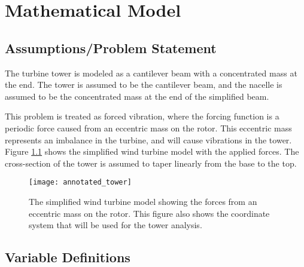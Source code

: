 \chapter{Mathematical Model} %

\label{ch_math_model}


\section{Assumptions/Problem Statement}

The turbine tower is modeled as a cantilever beam with a concentrated mass at the end.  The tower is assumed to be the cantilever beam, and the nacelle is assumed to be the concentrated mass at the end of the simplified beam.

This problem is treated as forced vibration, where the forcing function is a periodic force caused from an eccentric mass on the rotor.  This eccentric mass represents an imbalance in the turbine, and will cause vibrations in the tower.   Figure \ref{fig:annotated_tower} shows the simplified wind turbine model with the applied forces. The cross-section of the tower is assumed to taper linearly from the base to the top.

\begin{figure}
	\centering
	\texttt{[image: annotated\_tower]}
	\decoRule
	\caption{The simplified wind turbine model showing the forces from an eccentric mass on the rotor.  This figure also shows the coordinate system that will be used for the tower analysis.}
	\label{fig:annotated_tower}
\end{figure}


\section{Variable Definitions}

